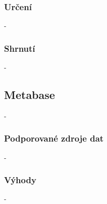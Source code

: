 \subsubsection{Určení}
-

\subsubsection{Shrnutí}
-

\subsection{Metabase}
- 

\subsubsection{Podporované zdroje dat} 
- 

\subsubsection{Výhody} 
- 





